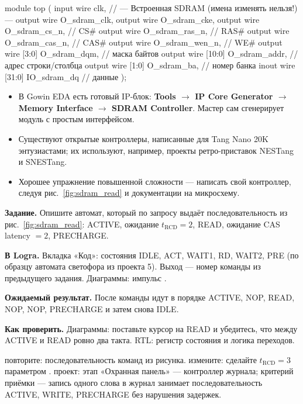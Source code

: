 \begin{vcode}
module top (
    input  wire        clk,
    // --- Встроенная SDRAM (имена изменять нельзя!) ---
    output wire        O_sdram_clk,
    output wire        O_sdram_cke,
    output wire        O_sdram_cs_n,    // CS#
    output wire        O_sdram_ras_n,   // RAS#
    output wire        O_sdram_cas_n,   // CAS#
    output wire        O_sdram_wen_n,   // WE#
    output wire [3:0]  O_sdram_dqm,     // маска байтов
    output wire [10:0] O_sdram_addr,    // адрес строки/столбца
    output wire [1:0]  O_sdram_ba,      // номер банка
    inout  wire [31:0] IO_sdram_dq      // данные
);
\end{vcode}

\begin{infobox}
\begin{itemize}
  \item В Gowin EDA есть готовый IP-блок: \textbf{Tools $\to$ IP Core Generator
        $\to$ Memory Interface $\to$ SDRAM Controller}. Мастер сам
        сгенерирует модуль с простым интерфейсом.
  \item Существуют открытые контроллеры, написанные для Tang Nano 20K
        энтузиастами; их используют, например, проекты ретро-приставок NESTang и
        SNESTang.
  \item Хорошее упражнение повышенной сложности --- написать свой контроллер,
        следуя рис.~\ref{fig:sdram_read} и документации на микросхему.
\end{itemize}
\end{infobox}

\begin{diybox}
\textbf{Задание.} Опишите автомат, который по запросу  выдаёт последовательность из рис.~\ref{fig:sdram_read}: ACTIVE, ожидание $t_\text{RCD}=2$, READ, ожидание CAS latency $=2$, PRECHARGE.

\textbf{В Logra.} Вкладка «Код»: состояния IDLE, ACT, WAIT1, RD, WAIT2, PRE (по образцу автомата светофора из проекта 5). Выход --- номер команды из предыдущего задания. Диаграммы: импульс .

\textbf{Ожидаемый результат.} После  команды идут в порядке ACTIVE, NOP, READ, NOP, NOP, PRECHARGE и затем снова IDLE.

\textbf{Как проверить.} Диаграммы: поставьте курсор на READ и убедитесь, что между ACTIVE и READ ровно два такта. RTL: регистр состояния и логика переходов.

 повторите: последовательность команд из рисунка.  измените: сделайте $t_\text{RCD}=3$ параметром .  проект: этап «Охранная панель» --- контроллер журнала; критерий приёмки --- запись одного слова в журнал занимает последовательность ACTIVE, WRITE, PRECHARGE без нарушения задержек.
\end{diybox}

